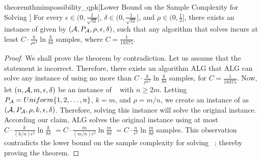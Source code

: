 \begin{restatable}{theorem}{thmimpossibility_qpk}[Lower Bound on the Sample Complexity for Solving \protect\QPK]
\label{thm:impossibility_qpk}
For every $\epsilon \in (0, \frac{1}{\sqrt{32}}]$,
$\delta \in (0, \frac{1}{\sqrt{32}}]$,
and $\rho \in (0,\frac{1}{2}]$,
there exists an instance of \QPK given by $(\mathcal{A}, P_{\mathcal{A}}, \rho, \epsilon, \delta)$,
such that
any algorithm that solves \QPK incurs at least
$C\cdot \frac{k}{\rho\epsilon^2}\ln\frac{k}{8\delta}$ samples, where 
$C = \frac{1}{18375}$.
\end{restatable}
\begin{proof}
We shall prove the theorem by contradiction. Let us assume that  the
statement is incorrect. Therefore, there exists an algorithm \textsc{ALG} that \textsc{ALG} can solve
any instance of \QPK using no more than
$C\cdot \frac{k}{\rho\epsilon^2}\ln\frac{k}{8\delta}$ samples, for
$C= \frac{1}{18375}$. Now, let $(n, \mathcal{A}, m, \epsilon, \delta)$ be an instance of \SUBSET~\citep{bib:arcsk2017} with
$n \geq 2m$. Letting $P_{\mathcal{A}} = Uniform\{1,2, \dots, n\}$, $k = m$, and $\rho = m /n$, we
create an instance of \QPK as $(\mathcal{A}, P_{\mathcal{A}}, \rho, k, \epsilon, \delta)$. Therefore, solving
this \QPK instance will solve the original \SUBSET instance.
According our claim, \textsc{ALG} solves the original \SUBSET instance using at most
$C\cdot \frac{k}{(k/n)\epsilon^2}\ln\frac{k}{8\delta}$
$ = C\cdot \frac{m}{(m/n)\epsilon^2}\ln\frac{m}{8\delta}$
$ = C\cdot \frac{n}{\epsilon^2}\ln\frac{m}{8\delta}$ samples. 
This observation contradicts the lower bound on the sample complexity for solving \SUBSET~\citep[Theorem 8]{bib:lucb}; thereby proving the theorem.
\end{proof}


